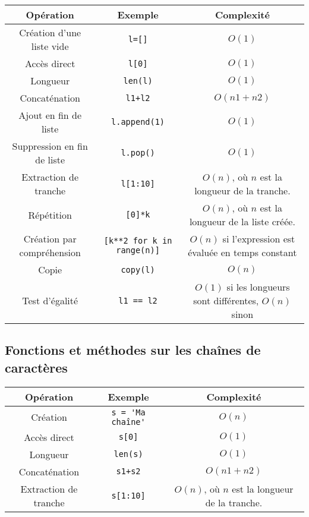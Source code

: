\documentclass[10pt]{article}
\begin{document}
\begin{tabular}{|c|c|c|}
  \hline
  Opération & Exemple & Complexité \\
  \hline 
  \hline 
  Création d'une liste vide & \verb+l=[]+ & $O(1)$\\
  \hline 
  Accès direct & \verb+l[0]+ & $O(1)$\\
  \hline
  Longueur & \verb+len(l)+ & $O(1)$\\
  \hline
  Concaténation & \verb-l1+l2- & $O(n1+n2)$\\
  \hline
  Ajout en fin de liste & \verb+l.append(1)+ & $O(1)$\\
  \hline
  Suppression en fin de liste & \verb+l.pop()+ & $O(1)$\\
  \hline
  Extraction de tranche & \verb+l[1:10]+ & $O(n)$, où $n$ est la longueur de la tranche.\\
  \hline
  Répétition & \verb+[0]*k+ & $O(n)$, où $n$ est la longueur de la liste créée. \\
  \hline
  Création par compréhension & \verb+[k**2 for k in range(n)]+ & $O(n)$ si l'expression est évaluée en temps constant\\
  \hline
  Copie & \verb+copy(l)+ & $O(n)$\\
  \hline
  Test d'égalité & \verb+l1 == l2+ & $O(1)$ si les longueurs sont différentes, $O(n)$ sinon\\
  \hline
\end{tabular}

\subsection*{Fonctions et méthodes sur les chaînes de caractères}


\begin{tabular}{|c|c|c|}
  \hline
  Opération & Exemple & Complexité \\
  \hline 
  \hline
  Création & \verb+s = 'Ma chaîne'+ & $O(n)$\\
  \hline
  Accès direct & \verb+s[0]+ & $O(1)$\\
  \hline
  Longueur & \verb+len(s)+ & $O(1)$\\
  \hline
  Concaténation & \verb-s1+s2- & $O(n1+n2)$\\
  \hline
  Extraction de tranche & \verb+s[1:10]+ & $O(n)$, où $n$ est la longueur de la tranche.\\
  \hline
\end{tabular}
\end{document}
